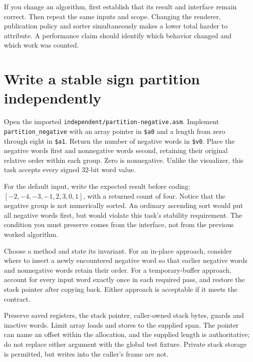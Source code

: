 If you change an algorithm, first establish that its result and interface remain
correct. Then repeat the same inputs and scope. Changing the renderer, publication
policy and sorter simultaneously makes a lower total harder to attribute. A
performance claim should identify which behavior changed and which work was counted.

\section{Write a stable sign partition independently}

Open the imported \texttt{independent/partition-negative.asm}. Implement
\texttt{partition\_negative}
with an array pointer in \texttt{\$a0} and a length from zero through eight in
\texttt{\$a1}. Return the number of negative words in \texttt{\$v0}. Place the
negative words first and nonnegative words second, retaining their original
relative order within each group. Zero is nonnegative. Unlike the visualizer,
this task accepts every signed 32-bit word value.

For the default input, write the expected result before coding:
$[-2,-4,-3,-1,2,3,0,1]$, with a returned count of four. Notice that the negative
group is not numerically sorted. An ordinary ascending sort would put all negative
words first, but would violate this task's stability requirement. The condition
you must preserve comes from the interface, not from the previous worked algorithm.

Choose a method and state its invariant. For an in-place approach, consider where
to insert a newly encountered negative word so that earlier negative words and
nonnegative words retain their order. For a temporary-buffer approach, account
for every input word exactly once in each required pass, and restore the stack
pointer after copying back. Either approach is acceptable if it meets the contract.

Preserve saved registers, the stack pointer, caller-owned stack bytes, guards and
inactive words. Limit array loads and stores to the supplied span. The pointer
can name an offset within the allocation, and the supplied length is authoritative;
do not replace either argument with the global test fixture. Private stack storage
is permitted, but writes into the caller's frame are not.

